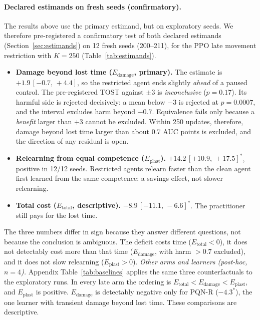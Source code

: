 \documentclass[10pt]{article} %
\newcommand{\sig}{^{\ast}}
\newcommand{\ci}[2]{\,[#1,\,#2]}
\begin{document}
\paragraph{Declared estimands on fresh seeds (confirmatory).}
The results above use the primary estimand, but on exploratory seeds. We therefore pre-registered a confirmatory test of both declared estimands (Section~\ref{sec:estimands}) on 12 fresh seeds (200--211), for the PPO late movement restriction with $K=250$ (Table~\ref{tab:estimands}).
\begin{itemize}
\item \textbf{Damage beyond lost time ($E_{\mathrm{damage}}$, primary).} The estimate is $+1.9\ci{-0.7}{+4.4}$, so the restricted agent ends slightly \emph{ahead} of a paused control. The pre-registered TOST against $\pm3$ is \emph{inconclusive} ($p=0.17$). Its harmful side is rejected decisively: a mean below $-3$ is rejected at $p=0.0007$, and the interval excludes harm beyond $-0.7$. Equivalence fails only because a \emph{benefit} larger than $+3$ cannot be excluded. Within 250 updates, therefore, damage beyond lost time larger than about 0.7 AUC points is excluded, and the direction of any residual is open.
\item \textbf{Relearning from equal competence ($E_{\mathrm{plast}}$).} $+14.2\ci{+10.9}{+17.5}\sig$, positive in 12/12 seeds. Restricted agents relearn faster than the clean agent first learned from the same competence: a savings effect, not slower relearning.
\item \textbf{Total cost ($E_{\mathrm{total}}$, descriptive).} $-8.9\ci{-11.1}{-6.6}\sig$. The practitioner still pays for the lost time.
\end{itemize}
The three numbers differ in sign because they answer different questions, not because the conclusion is ambiguous. The deficit costs time ($E_{\mathrm{total}}<0$), it does not detectably cost more than that time ($E_{\mathrm{damage}}$, with harm $>0.7$ excluded), and it does not slow relearning ($E_{\mathrm{plast}}>0$).
\emph{Other arms and learners (post-hoc, $n=4$).} Appendix Table~\ref{tab:baselines} applies the same three counterfactuals to the exploratory runs. In every late arm the ordering is $E_{\mathrm{total}}<E_{\mathrm{damage}}<E_{\mathrm{plast}}$, and $E_{\mathrm{plast}}$ is positive. $E_{\mathrm{damage}}$ is detectably negative only for PQN-R ($-4.3\sig$), the one learner with transient damage beyond lost time. These comparisons are descriptive.
\end{document}
